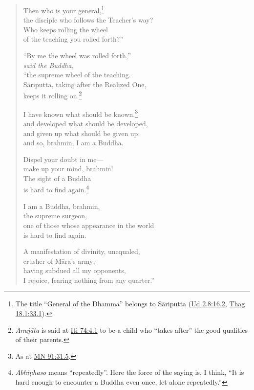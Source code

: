 \documentclass[12pt,openany]{book}%
\newcommand*{\scspeaker}[1]{\hspace{2em}\textit{#1}}
\begin{document}
\begin{verse}
Then who is your general,\footnote{The title “General of the Dhamma” belongs to \textsanskrit{Sāriputta} (\href{https://suttacentral.net/ud2.8/en/sujato\#16.2}{Ud 2.8:16.2}, \href{https://suttacentral.net/thag18.1/en/sujato\#33.1}{Thag 18.1:33.1}). } \\
the disciple who follows the Teacher’s way? \\
Who keeps rolling the wheel \\
of the teaching you rolled forth?” 

“By me the wheel was rolled forth,” \\
\scspeaker{said the Buddha, }\\
“the supreme wheel of the teaching. \\
\textsanskrit{Sāriputta}, taking after the Realized One, \\
keeps it rolling on.\footnote{\textit{\textsanskrit{Anujāta}} is said at \href{https://suttacentral.net/iti74/en/sujato\#4.1}{Iti 74:4.1} to be a child who “takes after” the good qualities of their parents. } 

I have known what should be known,\footnote{As at \href{https://suttacentral.net/mn91/en/sujato\#31.5}{MN 91:31.5}. } \\
and developed what should be developed, \\
and given up what should be given up: \\
and so, brahmin, I am a Buddha. 

Dispel your doubt in me—\\
make up your mind, brahmin! \\
The sight of a Buddha \\
is hard to find again.\footnote{\textit{\textsanskrit{Abhiṇhaso}} means “repeatedly”. Here the force of the saying is, I think, “It is hard enough to encounter a Buddha even once, let alone repeatedly.” } 

I am a Buddha, brahmin, \\
the supreme surgeon, \\
one of those whose appearance in the world \\
is hard to find again. 

A manifestation of divinity, unequaled, \\
crusher of \textsanskrit{Māra}’s army; \\
having subdued all my opponents, \\
I rejoice, fearing nothing from any quarter.” 


\end{verse}
\end{document}
